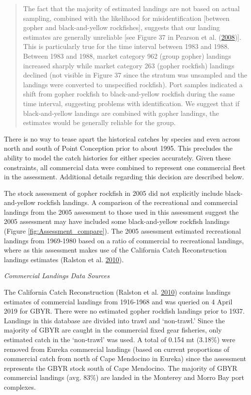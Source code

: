 \documentclass[12pt,]{article}
\begin{document}
\begin{quote}
The fact that the majority of estimated landings are not based on actual
sampling, combined with the likelihood for misidentification {[}between
gopher and black-and-yellow rockfishes{]}, suggests that our landing
estimates are generally unreliable {[}see Figure 37 in Pearson et al.
(\protect\hyperlink{ref-Pearson2008}{2008}){]}. This is particularly
true for the time interval between 1983 and 1988. Between 1983 and 1988,
market category 962 (group gopher) landings increased sharply while
market category 263 (gopher rockfish) landings declined (not visible in
Figure 37 since the stratum was unsampled and the landings were
converted to unspecified rockfish). Port samples indicated a shift from
gopher rockfish to black-and-yellow rockfish during the same time
interval, suggesting problems with identification. We suggest that if
black-and-yellow landings are combined with gopher landings, the
estimates would be generally reliable for the group.
\end{quote}

There is no way to tease apart the historical catches by species and
even across north and south of Point Conception prior to about 1995.
This precludes the ability to model the catch histories for either
species accurately. Given these constraints, all commercial data were
combined to represent one commercial fleet in the assessment. Additional
details regarding this decision are described below.

The stock assessment of gopher rockfish in 2005 did not explicitly
include black-and-yellow rockfish landings. A comparison of the
recreational and commercial landings from the 2005 assessment to those
used in this assessment suggest the 2005 assessment may have included
some black-and-yellow rockfish landings (Figure
\ref{fig:Assessment_compare}). The 2005 assessment estimated
recreational landings from 1969-1980 based on a ratio of commercial to
recreational landings, where as this assessment makes use of the
California Catch Reconstruction landings estimates (Ralston et al.
\protect\hyperlink{ref-Ralston2010}{2010}).

\emph{Commercial Landings Data Sources}

The California Catch Reconstruction (Ralston et al.
\protect\hyperlink{ref-Ralston2010}{2010}) contains landings estimates
of commercial landings from 1916-1968 and was queried on 4 April 2019
for GBYR. There were no estimated gopher rockfish landings prior to
1937. Landings in this database are divided into trawl and `non-trawl.'
Since the majority of GBYR are caught in the commercial fixed gear
fisheries, only estimated catch in the `non-trawl' was used. A total of
0.154 mt (3.18\%) were removed from Eureka commercial landings (based on
current proportions of commercial catch from north of Cape Mendocino in
Eureka) since the assessment represents the GBYR stock south of Cape
Mendocino. The majority of GBYR commercial landings (avg. 83\%) are
landed in the Monterey and Morro Bay port complexes.
\end{document}
